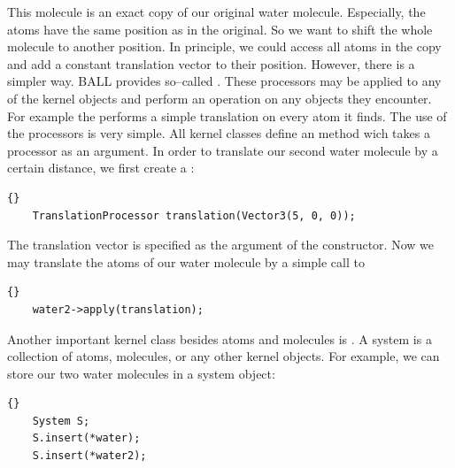 \noindent
This molecule is an exact copy of our original water molecule. Especially, the
atoms have the same position as in the original. So we want to shift the whole
molecule to another position.  In principle, we could access all atoms in the
copy and add a constant translation vector to their position. However, there
is a simpler way. BALL provides so--called . These
processors may be applied to any of the kernel objects and perform an
operation on any objects they encounter. For example the
 performs a simple translation on every atom it
finds. The use of the processors is very simple.  All kernel classes define an
 method wich takes a processor as an argument. In order to
translate our second water molecule by a certain distance, we first create a
:

\begin{lstlisting}{}
	TranslationProcessor translation(Vector3(5, 0, 0));
\end{lstlisting}
	
\noindent
The translation vector is specified as the argument of the constructor. Now we
may translate the atoms of our water molecule by a simple call to 

\begin{lstlisting}{}
	water2->apply(translation);
\end{lstlisting}

\noindent
Another important kernel class besides atoms and molecules is .
A system is a collection of atoms, molecules, or any other kernel objects. For
example, we can store our two water molecules in a system object:

\begin{lstlisting}{}
	System S;
	S.insert(*water);
	S.insert(*water2);
\end{lstlisting}

